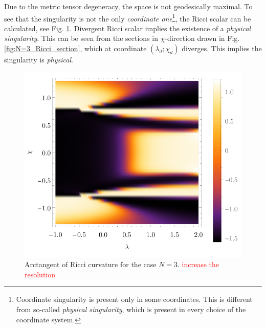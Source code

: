 Due to the metric tensor degeneracy, the space is not geodesically maximal. To see that the singularity is not the only \emph{coordinate one}\footnote{Coordinate singularity is present only in some coordinates. This is different from so-called \emph{physical singularity}, which is present in every choice of the coordinate system.}, the Ricci scalar can be calculated, see Fig. \ref{fig:N=3_Ricci}. Divergent Ricci scalar implies the existence of a \emph{physical singularity}. This can be seen from the sections in $\chi$-direction drawn in Fig. \ref{fig:N=3_Ricci_section}, which at coordinate $(\lambda_d;\chi_d)$ diverges. This implies the singularity is \emph{physical}. 


\begin{figure}[H]
    \centering
    \includegraphics{../img/N=3_Ricci.pdf}
    \caption{Arctangent of Ricci curvature for the case $N=3$. \textcolor{red}{increase the resolution}}
    \label{fig:N=3_Ricci}
\end{figure}

